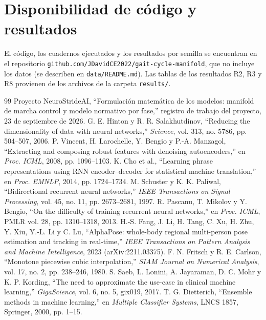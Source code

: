 \documentclass[11pt,a4paper]{article}
\begin{document}
\section*{Disponibilidad de código y resultados}

El código, los cuadernos ejecutados y los resultados por semilla se encuentran en el repositorio \texttt{github.com/JDavidCE2022/gait-cycle-manifold}, que no incluye los datos (se describen en \texttt{data/README.md}). Las tablas de los resultados R2, R3 y R8 provienen de los archivos de la carpeta \texttt{results/}.

\begin{thebibliography}{99}
\small
{} Proyecto NeuroStrideAI, ``Formulación matemática de los modelos: manifold de marcha control y modelo normativo por fase,'' registro de trabajo del proyecto, 23 de septiembre de 2026.
 G. E. Hinton y R. R. Salakhutdinov, ``Reducing the dimensionality of data with neural networks,'' \emph{Science}, vol. 313, no. 5786, pp. 504--507, 2006.
 P. Vincent, H. Larochelle, Y. Bengio y P.-A. Manzagol, ``Extracting and composing robust features with denoising autoencoders,'' en \emph{Proc. ICML}, 2008, pp. 1096--1103.
 K. Cho et al., ``Learning phrase representations using RNN encoder--decoder for statistical machine translation,'' en \emph{Proc. EMNLP}, 2014, pp. 1724--1734.
 M. Schuster y K. K. Paliwal, ``Bidirectional recurrent neural networks,'' \emph{IEEE Transactions on Signal Processing}, vol. 45, no. 11, pp. 2673--2681, 1997.
 R. Pascanu, T. Mikolov y Y. Bengio, ``On the difficulty of training recurrent neural networks,'' en \emph{Proc. ICML}, PMLR vol. 28, pp. 1310--1318, 2013.
 H.-S. Fang, J. Li, H. Tang, C. Xu, H. Zhu, Y. Xiu, Y.-L. Li y C. Lu, ``AlphaPose: whole-body regional multi-person pose estimation and tracking in real-time,'' \emph{IEEE Transactions on Pattern Analysis and Machine Intelligence}, 2023 (arXiv:2211.03375).
 F. N. Fritsch y R. E. Carlson, ``Monotone piecewise cubic interpolation,'' \emph{SIAM Journal on Numerical Analysis}, vol. 17, no. 2, pp. 238--246, 1980.
 S. Saeb, L. Lonini, A. Jayaraman, D. C. Mohr y K. P. Kording, ``The need to approximate the use-case in clinical machine learning,'' \emph{GigaScience}, vol. 6, no. 5, gix019, 2017.
 T. G. Dietterich, ``Ensemble methods in machine learning,'' en \emph{Multiple Classifier Systems}, LNCS 1857, Springer, 2000, pp. 1--15.

\end{thebibliography}
\end{document}
